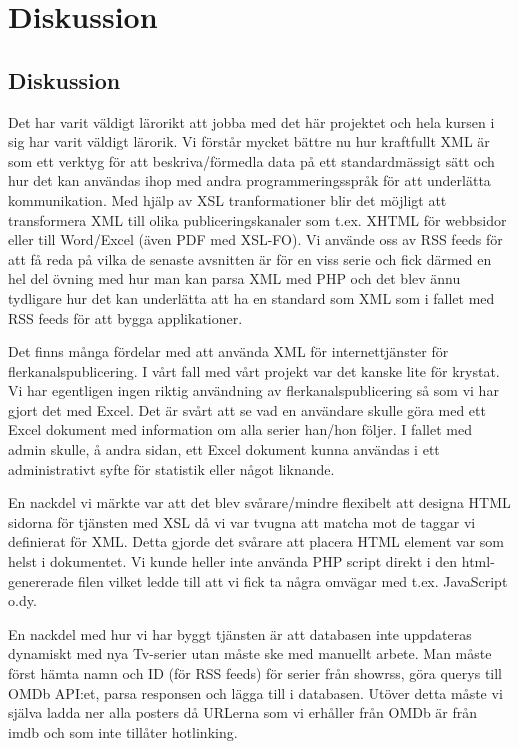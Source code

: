 \chapter{Diskussion}
\section{Diskussion}
Det har varit väldigt lärorikt att jobba med det här projektet och hela kursen i sig har varit väldigt lärorik. Vi förstår mycket bättre nu hur kraftfullt XML är som ett verktyg för att beskriva/förmedla data på ett standardmässigt sätt och hur det kan användas ihop med andra programmeringsspråk för att underlätta kommunikation. Med hjälp av XSL tranformationer blir det möjligt att transformera XML till olika publiceringskanaler som t.ex. XHTML för webbsidor eller till Word/Excel (även PDF med XSL-FO). Vi använde oss av RSS feeds för att få reda på vilka de senaste avsnitten är för en viss serie och fick därmed en hel del övning med hur man kan parsa XML med PHP och det blev ännu tydligare hur det kan underlätta att ha en standard som XML som i fallet med RSS feeds för att bygga applikationer.

Det finns många fördelar med att använda XML för internettjänster för flerkanalspublicering. I vårt fall med vårt projekt var det kanske lite för krystat. Vi har egentligen ingen riktig användning av flerkanalspublicering så som vi har gjort det med Excel. Det är svårt att se vad en användare skulle göra med ett Excel dokument med information om alla serier han/hon följer. I fallet med admin skulle, å andra sidan, ett Excel dokument kunna användas i ett administrativt syfte för statistik eller något liknande. 

En nackdel vi märkte var att det blev svårare/mindre flexibelt att designa HTML sidorna för tjänsten med XSL då vi var tvugna att matcha mot de taggar vi definierat för XML. Detta gjorde det svårare att placera HTML element var som helst i dokumentet. Vi kunde heller inte använda PHP script direkt i den html-genererade filen vilket ledde till att vi fick ta några omvägar med t.ex. JavaScript o.dy. 

En nackdel med hur vi har byggt tjänsten är att databasen inte uppdateras dynamiskt med nya Tv-serier utan måste ske med manuellt arbete. Man måste först hämta namn och ID (för RSS feeds) för serier från showrss, göra querys till OMDb API:et, parsa responsen och lägga till i databasen. Utöver detta måste vi själva ladda ner alla posters då URLerna som vi erhåller från OMDb är från imdb och som inte tillåter hotlinking. 
